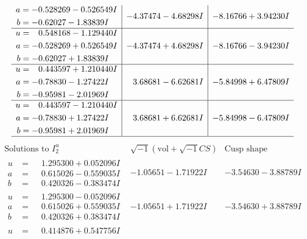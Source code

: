 \documentclass[1p]{elsarticle_modified}
\theoremstyle{definition}
\newcommand{\I}{\sqrt{-1}}
\begin{document}
$$\begin{array}{c|c|c}
\begin{aligned}
a &= -0.528269 - 0.526549 I \\
b &= -0.62027 - 1.83839 I\end{aligned}
 & -4.37474 - 4.68298 I & -8.16766 + 3.94230 I \\ \hline\begin{aligned}
u &= \phantom{-}0.548168 - 1.129440 I \\
a &= -0.528269 + 0.526549 I \\
b &= -0.62027 + 1.83839 I\end{aligned}
 & -4.37474 + 4.68298 I & -8.16766 - 3.94230 I \\ \hline\begin{aligned}
u &= \phantom{-}0.443597 + 1.210440 I \\
a &= -0.78830 - 1.27422 I \\
b &= -0.95981 - 2.01969 I\end{aligned}
 & \phantom{-}3.68681 - 6.62681 I & -5.84998 + 6.47809 I \\ \hline\begin{aligned}
u &= \phantom{-}0.443597 - 1.210440 I \\
a &= -0.78830 + 1.27422 I \\
b &= -0.95981 + 2.01969 I\end{aligned}
 & \phantom{-}3.68681 + 6.62681 I & -5.84998 - 6.47809 I\\
 \hline 
 \end{array}$$\newpage$$\begin{array}{c|c|c}  
\text{Solutions to }I^u_{2}& \I (\text{vol} + \sqrt{-1}CS) & \text{Cusp shape}\\
 \hline 
\begin{aligned}
u &= \phantom{-}1.295300 + 0.052096 I \\
a &= \phantom{-}0.615026 - 0.559035 I \\
b &= \phantom{-}0.420326 - 0.383474 I\end{aligned}
 & -1.05651 - 1.71922 I & -3.54630 - 3.88789 I \\ \hline\begin{aligned}
u &= \phantom{-}1.295300 - 0.052096 I \\
a &= \phantom{-}0.615026 + 0.559035 I \\
b &= \phantom{-}0.420326 + 0.383474 I\end{aligned}
 & -1.05651 + 1.71922 I & -3.54630 + 3.88789 I \\ \hline\begin{aligned}
u &= \phantom{-}0.414876 + 0.547756 I \\

\end{aligned}
\end{array}$$
\end{document}
